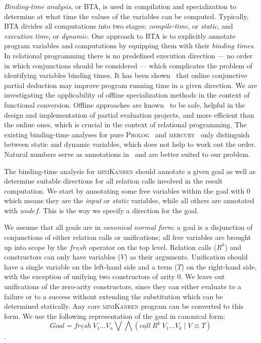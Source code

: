 \documentclass[submission,copyright,creativecommons]{eptcs}
\newcommand{\miniKanren}{\textsc{miniKanren}}
\newcommand{\prolog}{\textsc{Prolog}}
\newcommand{\mercury}{\textsc{mercury}}
\newcommand\undef{unde\!f}
\newcommand\fresh{f\!resh}
\begin{document}
\emph{Binding-time analysis}, or BTA, is used in compilation and specialization to determine at what time the values of the variables can be computed.
Typically, BTA divides all computations into two stages: \emph{compile-time}, or \emph{static}, and \emph{execution time}, or \emph{dynamic}.
One approach to BTA is to explicitly annotate program variables and computations by equipping them with their \emph{binding times}.
In relational programming there is no predefined execution direction --- no order in which conjunctions should be considered ---
which complicates the problem of identifying variables binding times.
It has been shown~\cite{lozov2019relational} that online conjunctive partial deduction may improve program running time in a given direction.
We are investigating the applicability of offline specialization methods in the context of functional conversion.
Offline approaches are known~\cite{jones1993partial} to be safe, helpful in the design and implementation of partial evaluation projects, and more efficient than the online ones, which is crucial in the context of relational programming.
The existing binding-time analyses for pure \prolog{}~\cite{craig2004fully} and \mercury{}~\cite{vanhoof2004binding} only distinguish between static and dynamic variables, which does not help to work out the order.
Natural numbers serve as annotations in~\cite{Thiemann1997AUF} and are better suited to our problem.


The binding-time analysis for \miniKanren{} should annotate a given goal as well as determine suitable directions for all relation calls involved in the result computation.
We start by annotating some free variables within the goal with $0$ which means they are the \emph{input} or \emph{static} variables, while all others are annotated with $\undef{}$.
This is the way we specify a direction for the goal.

We assume that all goals are in \emph{canonical normal form}: a goal is a disjunction of conjunctions of either relation calls or unifications; all free variables are brought up into scope by the $\underline{\fresh{}}$ operator on the top level.
Relation calls ($R^k$) and constructors can only have variables ($V$) as their arguments. Unification should have a single variable on the left-hand side and a term ($T$) on the right-hand side, with the exception of unifying two constructors of arity $0$.
We leave out unifications of the zero-arity constructors, since they can either evaluate to a failure or to a success without extending the substitution which can be determined statically.
Any core \miniKanren{} program can be converted to this form.
We use the following representation of the goal in canonical form:
$$Goal = \underline{\fresh{}} \ V_1 \dots V_n \bigvee \bigwedge (\underline{call} \ R^k \ V_1 \dots V_k \mid V \equiv T)$$.
\end{document}
